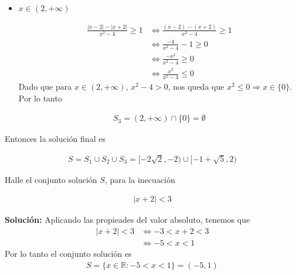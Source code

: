 \documentclass[12pt]{book}
\begin{document}
\begin{itemize}
\item $x \in (2,+\infty)$

\begin{align*}
    \frac{|x-2|-|x+2|}{x^2-4} \geq 1 &\Longleftrightarrow \frac{(x-2)-(x+2)}{x^2-4}\geq 1 \\
    &\Longleftrightarrow \frac{-4}{x^2-4}-1 \geq 0 \\
    &\Longleftrightarrow \frac{-x^2}{x^2-4} \geq 0 \\
    &\Longleftrightarrow \frac{x^2}{x^2-4}\leq 0 
\end{align*}
    Dado que para $x \in (2,+\infty)$, $x^2-4 >0$, nos queda que $x^2 \leq 0 \Longrightarrow x \in \{0\}$. Por lo tanto 

    \begin{align*}
        S_3 = (2,+\infty) \cap \{0\} = \emptyset
    \end{align*}
\end{itemize}
Entonces la solución final es 

\begin{align*}
    S=S_1\cup S_2 \cup S_3 = [-2\sqrt{2},-2) \cup [-1+\sqrt{5},2)
\end{align*}

\begin{prob}{}{}
    Halle el conjunto solución $S$, para la inecuación

    \begin{align*}
        |x+2|<3
    \end{align*}
\end{prob}
\textbf{Solución:}
Aplicando las propieades del valor absoluto, tenemos que 
\begin{align*}
    |x+2|<3 &\Longleftrightarrow -3 < x+2 < 3 \\
    &\Longleftrightarrow -5 <x < 1
\end{align*}
Por lo tanto el conjunto solución es 
\begin{align*}
    S = \{x \in \mathbb{R} : -5<x<1 \} = (-5,1)
\end{align*}
\end{document}
